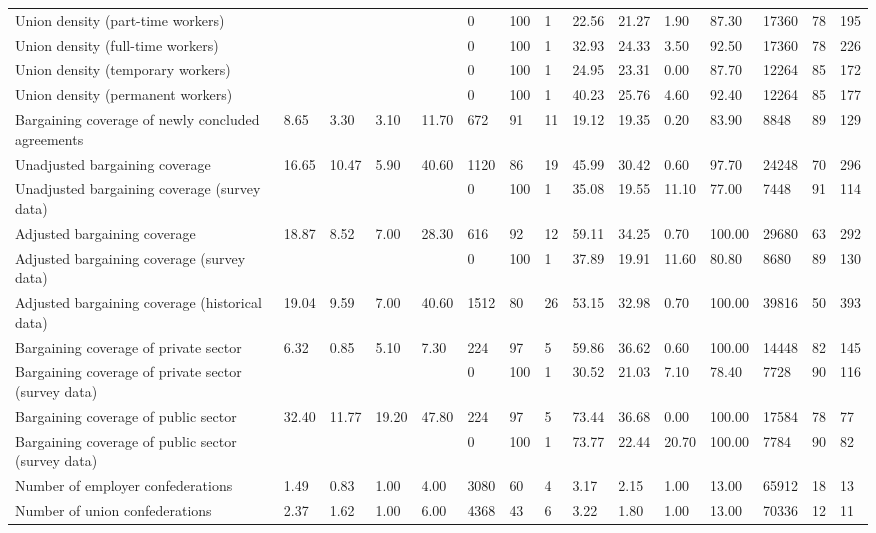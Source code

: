 \begin{longtable}{lllllllllllllll}
Union density (part-time workers) &  &  &  &  & 0 & 100 & 1 & 22.56 & 21.27 & 1.90 & 87.30 & 17360 & 78 & 195\\
Union density (full-time workers) &  &  &  &  & 0 & 100 & 1 & 32.93 & 24.33 & 3.50 & 92.50 & 17360 & 78 & 226\\
Union density (temporary workers) &  &  &  &  & 0 & 100 & 1 & 24.95 & 23.31 & 0.00 & 87.70 & 12264 & 85 & 172\\
Union density (permanent workers) &  &  &  &  & 0 & 100 & 1 & 40.23 & 25.76 & 4.60 & 92.40 & 12264 & 85 & 177\\
\addlinespace
Bargaining coverage of newly concluded agreements & 8.65 & 3.30 & 3.10 & 11.70 & 672 & 91 & 11 & 19.12 & 19.35 & 0.20 & 83.90 & 8848 & 89 & 129\\
Unadjusted bargaining coverage & 16.65 & 10.47 & 5.90 & 40.60 & 1120 & 86 & 19 & 45.99 & 30.42 & 0.60 & 97.70 & 24248 & 70 & 296\\
Unadjusted bargaining coverage (survey data) &  &  &  &  & 0 & 100 & 1 & 35.08 & 19.55 & 11.10 & 77.00 & 7448 & 91 & 114\\
Adjusted bargaining coverage & 18.87 & 8.52 & 7.00 & 28.30 & 616 & 92 & 12 & 59.11 & 34.25 & 0.70 & 100.00 & 29680 & 63 & 292\\
Adjusted bargaining coverage (survey data) &  &  &  &  & 0 & 100 & 1 & 37.89 & 19.91 & 11.60 & 80.80 & 8680 & 89 & 130\\
\addlinespace
Adjusted bargaining coverage (historical data) & 19.04 & 9.59 & 7.00 & 40.60 & 1512 & 80 & 26 & 53.15 & 32.98 & 0.70 & 100.00 & 39816 & 50 & 393\\
Bargaining coverage of private sector & 6.32 & 0.85 & 5.10 & 7.30 & 224 & 97 & 5 & 59.86 & 36.62 & 0.60 & 100.00 & 14448 & 82 & 145\\
Bargaining coverage of private sector (survey data) &  &  &  &  & 0 & 100 & 1 & 30.52 & 21.03 & 7.10 & 78.40 & 7728 & 90 & 116\\
Bargaining coverage of public sector & 32.40 & 11.77 & 19.20 & 47.80 & 224 & 97 & 5 & 73.44 & 36.68 & 0.00 & 100.00 & 17584 & 78 & 77\\
Bargaining coverage of public sector (survey data) &  &  &  &  & 0 & 100 & 1 & 73.77 & 22.44 & 20.70 & 100.00 & 7784 & 90 & 82\\
\addlinespace
Number of employer confederations & 1.49 & 0.83 & 1.00 & 4.00 & 3080 & 60 & 4 & 3.17 & 2.15 & 1.00 & 13.00 & 65912 & 18 & 13\\
Number of union confederations & 2.37 & 1.62 & 1.00 & 6.00 & 4368 & 43 & 6 & 3.22 & 1.80 & 1.00 & 13.00 & 70336 & 12 & 11\\

\end{longtable}
